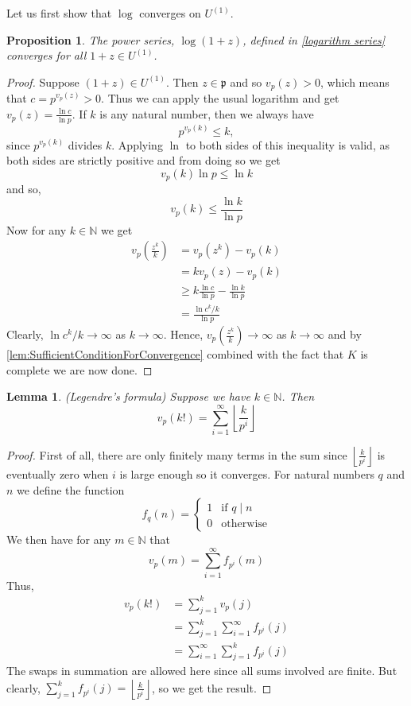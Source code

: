 \documentclass{article}
\newtheorem{proposition}{Proposition}[section]
\newtheorem{lemma}{Lemma}[section]
\newcommand{\mfrak}[1]{\mathfrak{#1}}
\newcommand{\mbb}[1]{\mathbb{#1}}
\numberwithin{equation}{section}
\begin{document}
Let us first show that $\log$ converges on $U^{(1)}$.
\begin{proposition}
    The power series, $\log(1+z)$, defined in \cref{logarithm series} converges for all $1+z \in U^{(1)}$.
\end{proposition}
\begin{proof}
    Suppose $(1 + z) \in U^{(1)}$. Then $z \in \mfrak p$ and so $v_p(z) > 0$, which means that $c = p^{v_p(z)} > 0$. Thus we can apply the usual logarithm and get $v_p(z) = \frac{\ln c}{\ln p}$. If $k$ is any natural number, then we always have $$p^{v_p(k)} \leq k,$$ since $p^{v_p(k)}$ divides $k$. Applying $\ln$ to both sides of this inequality is valid, as both sides are strictly positive and from doing so we get
    $$v_p(k) \ln p \leq \ln k$$
    and so,
    $$v_p(k) \leq \frac{\ln k}{\ln p}$$
    Now for any $k \in \mbb N$ we get
    \begin{align*}
        v_p(\frac{z^k}{k}) & = v_p(z^k) - v_p(k)                              \\
                           & = kv_p(z) - v_p(k)                               \\
                           & \geq k \frac{\ln c}{\ln p} - \frac{\ln k}{\ln p} \\
                           & = \frac{\ln c^k / k}{\ln p}
    \end{align*}
    Clearly, $\ln c^k / k \to \infty$ as $k \to \infty$. Hence, $v_p(\frac{z^k}{k}) \to \infty$ as $k \to \infty$ and by \cref{lem:SufficientConditionForConvergence} combined with the fact that $K$ is complete we are now done.
\end{proof}

\begin{lemma}(Legendre's formula)
    Suppose we have $k \in \mbb N$. Then
    $$v_p(k!) = \sum_{i = 1}^{\infty} \left\lfloor \frac{k}{p^i} \right \rfloor$$
\end{lemma}

\begin{proof}
    First of all, there are only finitely many terms in the sum since $\left\lfloor \frac{k}{p^i} \right \rfloor$ is eventually zero when $i$ is large enough so it converges. For natural numbers $q$ and $n$ we define the function
    $$f_q(n) = \begin{cases}
            1 & \text{if } q \mid n \\
            0 & \text{otherwise}
        \end{cases}$$
    We then have for any $m \in \mbb N$ that
    $$v_p(m) = \sum_{i = 1}^{\infty} f_{p^i}(m)$$
    Thus,
    \begin{align*}
        v_p(k!) & = \sum_{j = 1}^k v_p(j)                           \\
                & = \sum_{j = 1}^k \sum_{i = 1}^{\infty} f_{p^i}(j) \\
                & = \sum_{i = 1}^{\infty} \sum_{j = 1}^k f_{p^i}(j)
    \end{align*}
    The swaps in summation are allowed here since all sums involved are finite. But clearly, $\sum_{j = 1}^k f_{p^i}(j) = \left\lfloor \frac{k}{p^i} \right \rfloor$, so we get the result.
\end{proof}
\end{document}
